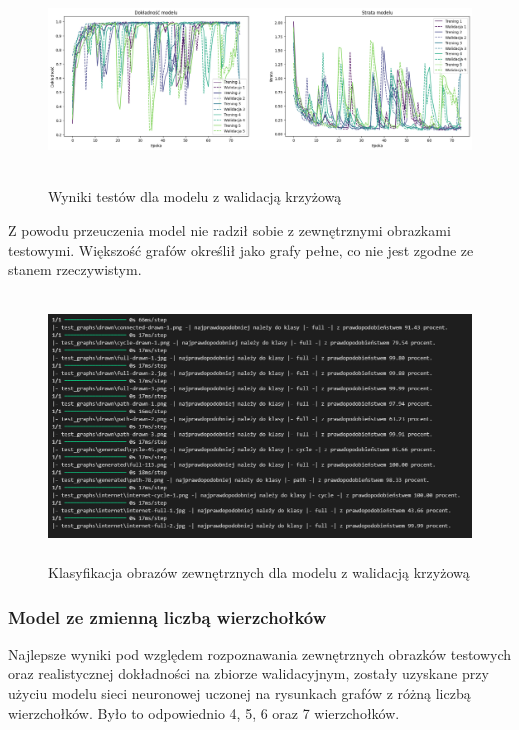 \begin{figure}[ht]
	\centering
	\includegraphics[height=5.5cm]{partials/tests/images/v2_crossvalid.png}
	\caption{Wyniki testów dla modelu z walidacją krzyżową}
	\label{Fig:tests-cv-1}
\end{figure}
\FloatBarrier

Z powodu przeuczenia model nie radził sobie z zewnętrznymi obrazkami testowymi.
Większość grafów określił jako grafy pełne, co nie jest zgodne ze stanem rzeczywistym.

\begin{figure}[ht]
	\centering
	\includegraphics[height=7cm]{partials/tests/images/v2_crossvalid_img_tests.png}
	\caption{Klasyfikacja obrazów zewnętrznych dla modelu z walidacją krzyżową}
	\label{Fig:tests-cv-2}
\end{figure}
\FloatBarrier

\subsubsection{Model ze zmienną liczbą wierzchołków}
Najlepsze wyniki pod względem rozpoznawania zewnętrznych obrazków testowych
oraz realistycznej dokładności na zbiorze walidacyjnym,
zostały uzyskane przy użyciu modelu sieci neuronowej uczonej na rysunkach grafów z różną liczbą wierzchołków.
Było to odpowiednio 4, 5, 6 oraz 7 wierzchołków.

